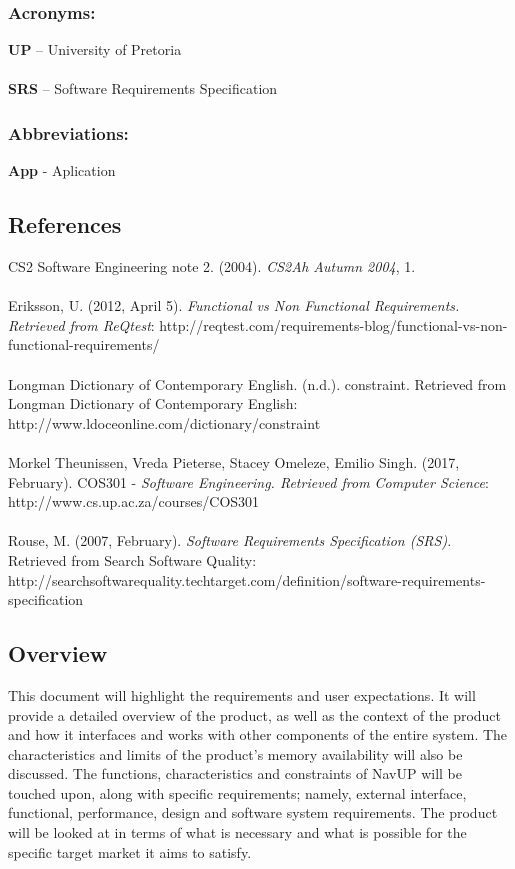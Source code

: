\documentclass[11pt]{article}
\begin{document}
		\subsubsection{Acronyms:}
		\textbf{UP} – University of Pretoria\\
		\\ \textbf{SRS} – Software Requirements Specification


		\subsubsection{Abbreviations:}
		\textbf{App} - Aplication


	\subsection{References}

CS2 Software Engineering note 2. (2004). \textit{CS2Ah Autumn 2004}, 1. \\\\
Eriksson, U. (2012, April 5). \textit{Functional vs Non Functional Requirements. Retrieved from ReQtest}: http://reqtest.com/requirements-blog/functional-vs-non-functional-requirements/ \\\\
Longman Dictionary of Contemporary English. (n.d.). constraint. Retrieved from Longman Dictionary of Contemporary English: http://www.ldoceonline.com/dictionary/constraint \\\\
Morkel Theunissen, Vreda Pieterse, Stacey Omeleze, Emilio Singh. (2017, February). COS301 - \textit{Software Engineering. Retrieved from Computer Science}: http://www.cs.up.ac.za/courses/COS301 \\\\
Rouse, M. (2007, February). \textit{Software Requirements Specification (SRS).} Retrieved from Search Software Quality: http://searchsoftwarequality.techtarget.com/definition/software-requirements-specification





	\subsection{Overview}
This document will highlight the requirements and user expectations. It will provide a detailed overview of the product, as well as the context of the product and how it interfaces and works with other components of the entire system. The characteristics and limits of the product’s memory availability will also be discussed.
\vspace{\baselineskip}
The functions, characteristics and constraints of NavUP will be touched upon, along with specific requirements; namely, external interface, functional, performance, design and software system requirements.
\vspace{\baselineskip}
The product will be looked at in terms of what is necessary and what is possible for the specific target market it aims to satisfy.
\end{document}
